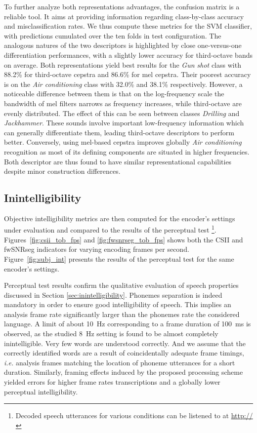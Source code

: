\documentclass[final,3p,times,twocolumn]{elsarticle}
\begin{document}
To further analyze both representations advantages, the confusion matrix is a reliable tool. It aims at providing information regarding class-by-class accuracy and misclassification rates. We thus compute these metrics for the SVM classifier, with predictions cumulated over the ten folds in test configuration. The analogous natures of the two descriptors is highlighted by close one-versus-one differentiation performances, with a slightly lower accuracy for third-octave bands on average. Both representations yield best results for the \textit{Gun shot} class with 88.2\% for third-octave cepstra and 86.6\% for mel cepstra. Their poorest accuracy is on the \textit{Air conditioning} class with 32.0\% and 38.1\% respectively. However, a noticeable difference between them is that on the log-frequency scale the bandwidth of mel filters narrows as frequency increases, while third-octave are evenly distributed. The effect of this can be seen between classes \textit{Drilling} and \textit{Jackhammer}. These sounds involve important low-frequency information which can generally differentiate them, leading third-octave descriptors to perform better. Conversely, using mel-based cepstra improves globally \textit{Air conditioning} recognition as most of its defining components are situated in higher frequencies.\\

Both descriptor are thus found to have similar representational capabilities despite minor construction differences.


\subsection{Inintelligibility}

Objective intelligibility metrics are then computed for the encoder's settings under evaluation and compared to the results of the perceptual test \footnote{Decoded speech utterances for various conditions can be listened to at \url{http://}}. Figures~\ref{fig:csii_tob_fps} and \ref{fig:fwsnrseg_tob_fps} shows both the CSII and fwSNRseg indicators for varying encoding frames per second. Figure~\ref{fig:subj_int} presents the results of the perceptual test for the same encoder's settings.

Perceptual test results confirm the qualitative evaluation of speech properties discussed in Section \ref{sec:inintelligibility}. Phonemes separation is indeed mandatory in order to ensure good intelligibility of speech. This implies an analysis frame rate significantly larger than the phonemes rate the considered language. A limit of about 10~Hz corresponding to a frame duration of 100~ms is observed, as the studied 8~Hz setting is found to be almost completely inintelligible. Very few words are understood correctly. And we assume that the correctly identified words are a result of coincidentally adequate frame timings, \textit{i.e.} analysis frames matching the location of phoneme utterances for a short duration. Similarly, framing effects induced by the proposed processing scheme yielded errors for higher frame rates transcriptions and a globally lower perceptual intelligibility.\\
\end{document}

